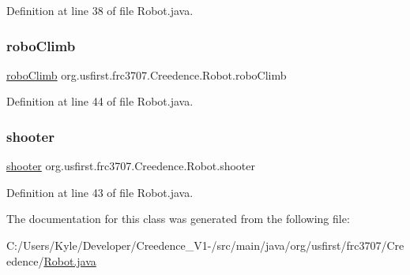 Definition at line 38 of file Robot.\+java.

\mbox{\label{classorg_1_1usfirst_1_1frc3707_1_1_creedence_1_1_robot_a8f86b89da7df1475d726eb3f9ae2b1f9}} 
\subsubsection{\texorpdfstring{roboClimb}{roboClimb}}
{\footnotesize\ttfamily \mbox{\hyperlink{classorg_1_1usfirst_1_1frc3707_1_1_creedence_1_1subsystems_1_1robo_climb}{robo\+Climb}} org.\+usfirst.\+frc3707.\+Creedence.\+Robot.\+robo\+Climb\hspace{0.3cm}{\ttfamily [static]}}



Definition at line 44 of file Robot.\+java.

\mbox{\label{classorg_1_1usfirst_1_1frc3707_1_1_creedence_1_1_robot_a7f1d0cb6e12db3b5317d374c63a6249a}} 
\subsubsection{\texorpdfstring{shooter}{shooter}}
{\footnotesize\ttfamily \mbox{\hyperlink{classorg_1_1usfirst_1_1frc3707_1_1_creedence_1_1subsystems_1_1shooter}{shooter}} org.\+usfirst.\+frc3707.\+Creedence.\+Robot.\+shooter\hspace{0.3cm}{\ttfamily [static]}}



Definition at line 43 of file Robot.\+java.



The documentation for this class was generated from the following file\+:\begin{DoxyCompactItemize}
\item 
C\+:/\+Users/\+Kyle/\+Developer/\+Creedence\+\_\+\+V1-\//src/main/java/org/usfirst/frc3707/\+Creedence/\mbox{\hyperlink{_robot_8java}{Robot.\+java}}\end{DoxyCompactItemize}
